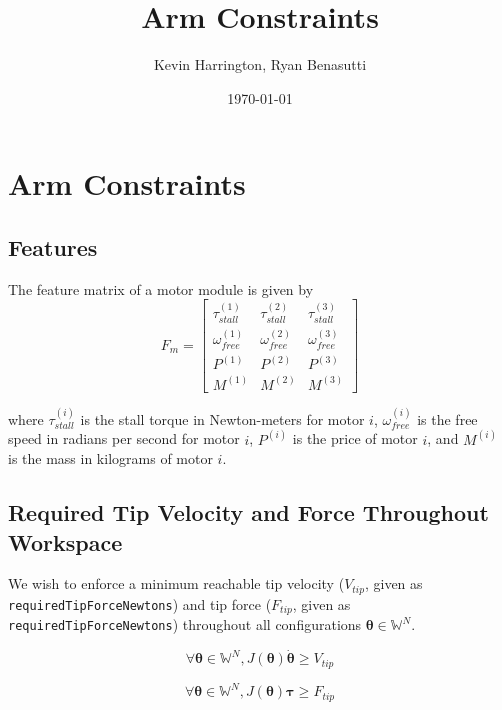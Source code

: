 \documentclass{article}
\title{Arm Constraints}
\author{Kevin Harrington, Ryan Benasutti}
\date{\today}
\begin{document}
\maketitle

\FloatBarrier
\section{Arm Constraints}

\FloatBarrier
\subsection{Features}

The feature matrix of a motor module is given by
\begin{equation}
    F_m =
    \begin{bmatrix}
        \tau_{stall}^{(1)} & \tau_{stall}^{(2)} & \tau_{stall}^{(3)} \\[6pt]
        \omega_{free}^{(1)} & \omega_{free}^{(2)} & \omega_{free}^{(3)} \\[6pt]
        P^{(1)} & P^{(2)} & P^{(3)} \\[6pt]
        M^{(1)} & M^{(2)} & M^{(3)}
    \end{bmatrix}
\end{equation}

where $\tau_{stall}^{(i)}$ is the stall torque in Newton-meters for motor $i$, $\omega_{free}^{(i)}$
is the free speed in radians per second for motor $i$, $P^{(i)}$ is the price of motor $i$, and
$M^{(i)}$ is the mass in kilograms of motor $i$.

\FloatBarrier
\subsection{Required Tip Velocity and Force Throughout Workspace}

We wish to enforce a minimum reachable tip velocity ($V_{tip}$, given as
\texttt{requiredTipForceNewtons}) and tip force ($F_{tip}$, given as
\texttt{requiredTipForceNewtons}) throughout all configurations $\boldsymbol{\theta} \in
\mathbb{W}^N$.

\begin{equation}
    \forall \boldsymbol{\theta} \in \mathbb{W}^N, J(\boldsymbol{\theta}) \boldsymbol{\dot{\theta}} \geq V_{tip}
    \label{eq:vtip_constraint}
\end{equation}

\begin{equation}
    \forall \boldsymbol{\theta} \in \mathbb{W}^N, J(\boldsymbol{\theta}) \boldsymbol{\tau} \geq F_{tip}
    \label{eq:ftip_constraint}
\end{equation}
\end{document}
